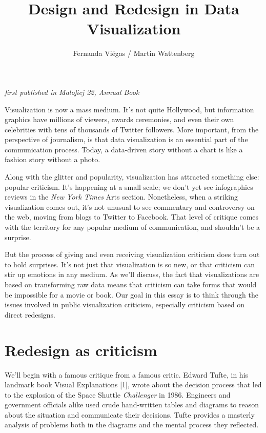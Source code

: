 \documentclass[sigconf,nonacm,screen,pbalance]{acmart}
\begin{document}
\title{Design and Redesign in Data Visualization}
\author{Fernanda Viégas / Martin Wattenberg}
\maketitle

{\em first published in Malofiej 22, Annual Book}

Visualization is now a mass medium. It's not quite Hollywood,
but information graphics have millions of viewers, awards ceremonies, and even their own
celebrities with tens of thousands of Twitter followers. More important, from the
perspective of journalism, is that data visualization is an essential part of the
communication process. Today, a data-driven story without a chart is like a fashion story
without a photo.

Along with the glitter and popularity, visualization has
attracted something else: popular criticism. It's happening at a small scale; we don't yet
see infographics reviews in the {\em New York Times} Arts section.
Nonetheless, when a striking visualization comes out, it's not unusual to see commentary
and controversy on the web, moving from blogs to Twitter to Facebook. That level of
critique comes with the territory for any popular medium of communication, and shouldn't
be a surprise.

But the process of giving and even receiving visualization
criticism does turn out to hold surprises. It's not just that visualization is so new, or
that criticism can stir up emotions in any medium. As we'll discuss, the fact that
visualizations are based on transforming raw data means that criticism can take forms that
would be impossible for a movie or book. Our goal in this essay is to think through the
issues involved in public visualization criticism, especially criticism based on direct
redesigns.

\section{Redesign as criticism}
We'll begin with a famous critique from a famous critic.
Edward Tufte, in his landmark book Visual Explanations [1], wrote about the decision
process that led to the explosion of the Space Shuttle {\em Challenger} in
1986. Engineers and government officials alike used crude hand-written tables and diagrams
to reason about the situation and communicate their decisions. Tufte provides a masterly
analysis of problems both in the diagrams and the mental process they reflected.
\end{document}
